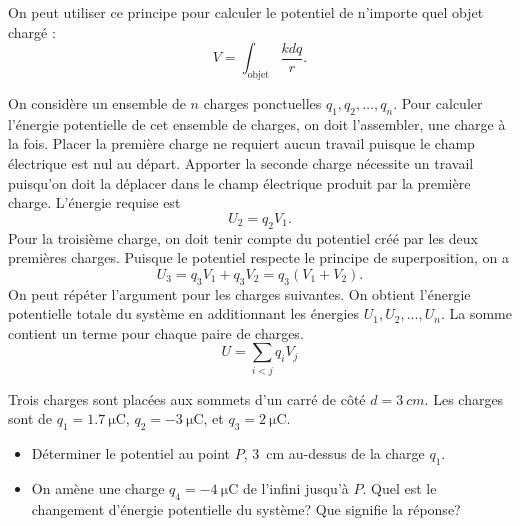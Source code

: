On peut utiliser ce principe pour calculer le potentiel de n'importe quel objet
chargé :
\[
  V = \int_\text{objet} \frac{k dq}{r}.
\]



On considère un ensemble de $n$ charges ponctuelles $q_1, q_2, \ldots, q_n$.
Pour calculer l'énergie potentielle de cet ensemble de charges, on doit
l'assembler, une charge à la fois. Placer la première charge ne requiert aucun
travail puisque le champ électrique est nul au départ. Apporter la seconde
charge nécessite un travail puisqu'on doit la déplacer dans le champ électrique
produit par la première charge. L'énergie requise est
\[
  U_2 = q_2 V_1.
\]
Pour la troisième charge, on doit tenir compte du potentiel créé par les deux
premières charges. Puisque le potentiel respecte le principe de superposition,
on a
\[
  U_3 = q_3 V_1 + q_3 V_2 = q_3 (V_1 + V_2).
\]
On peut répéter l'argument pour les charges suivantes. On obtient l'énergie
potentielle totale du système en additionnant les énergies $U_1, U_2, \ldots,
U_n$.  La somme contient un terme pour chaque paire de charges.
\[
  U = \sum_{i < j} q_i V_j
\]


\begin{diapobox}


  Trois charges sont placées aux sommets d'un carré de côté $d = \SI{3}{cm}$. Les
  charges sont de $q_1 = \SI{1.7}{\micro\coulomb}$, $q_2 = \SI{-3}{\micro\coulomb}$,
  et $q_3 = \SI{2}{\micro\coulomb}$.

  \begin{itemize}
    \item Déterminer le potentiel au point $P$, \SI{3}{cm} au-dessus de la
      charge $q_1$.
    \item On amène une charge $q_4 = \SI{-4}{\micro\coulomb}$ de l'infini jusqu'à $P$.
      Quel est le changement d'énergie potentielle du système? Que signifie la
      réponse?
  \end{itemize}

  \begin{center}
  \end{center}
\end{diapobox}

